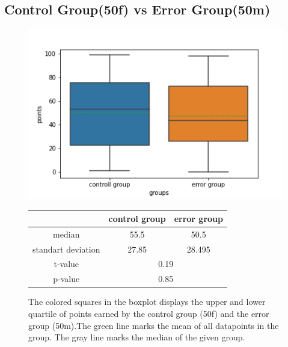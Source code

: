 \documentclass[runningheads]{llncs}
\begin{document}
\subsection{Control Group(50f) vs Error Group(50m)}
\begin{figure}
    \begin{minipage}{0.43\textwidth}        
        \includegraphics[width=\textwidth]{code/generate/all.png}
        \caption{The colored squares in the boxplot displays
        the upper and lower quartile of points earned by the control group (50f) and
        the error group (50m).The green line marks the mean of all datapoints in the group.
        The gray line marks the median  of the given group.} \label{fig7}
    \end{minipage}
\hfill
\begin{minipage}{0.43\textwidth}
\begin{tabular}[]{| c | c | c |}
        \hline
        & control group & error group \\
        \hline
        median & 55.5&50.5 \\
        \hline
        standart deviation & 27.85&28.495 \\
        \hline
        t-value & \multicolumn{2}{c|}{0.19} \\
        \hline
        p-value & \multicolumn{2}{c|}{0.85} \\
        \hline            
\end{tabular}
\end{minipage}
\end{figure}
\clearpage
\end{document}
